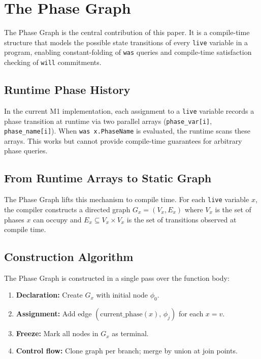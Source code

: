 \documentclass[11pt,a4paper]{article}
\begin{document}
\section{The Phase Graph}
\label{sec:phasegraph}

The Phase Graph is the central contribution of this paper. It is a compile-time structure that
models the possible state transitions of every \texttt{live} variable in a program, enabling
constant-folding of \texttt{was} queries and compile-time satisfaction checking of
\texttt{will} commitments.

\subsection{Runtime Phase History}

In the current M1 implementation, each assignment to a \texttt{live} variable records a phase
transition at runtime via two parallel arrays (\texttt{phase\_var[i]}, \texttt{phase\_name[i]}).
When \texttt{was x.PhaseName} is evaluated, the runtime scans these arrays. This works but
cannot provide compile-time guarantees for arbitrary phase queries.

\subsection{From Runtime Arrays to Static Graph}

The Phase Graph lifts this mechanism to compile time. For each \texttt{live} variable $x$, the
compiler constructs a directed graph $G_x = (V_x, E_x)$ where $V_x$ is the set of phases $x$
can occupy and $E_x \subseteq V_x \times V_x$ is the set of transitions observed at compile time.

\subsection{Construction Algorithm}

The Phase Graph is constructed in a single pass over the function body:

\begin{enumerate}[leftmargin=*,itemsep=2pt]
  \item \textbf{Declaration:} Create $G_x$ with initial node $\phi_0$.
  \item \textbf{Assignment:} Add edge $(\mathrm{current\_phase}(x),\,\phi_j)$ for each $x = v$.
  \item \textbf{Freeze:} Mark all nodes in $G_x$ as terminal.
  \item \textbf{Control flow:} Clone graph per branch; merge by union at join points.
\end{enumerate}
\end{document}
